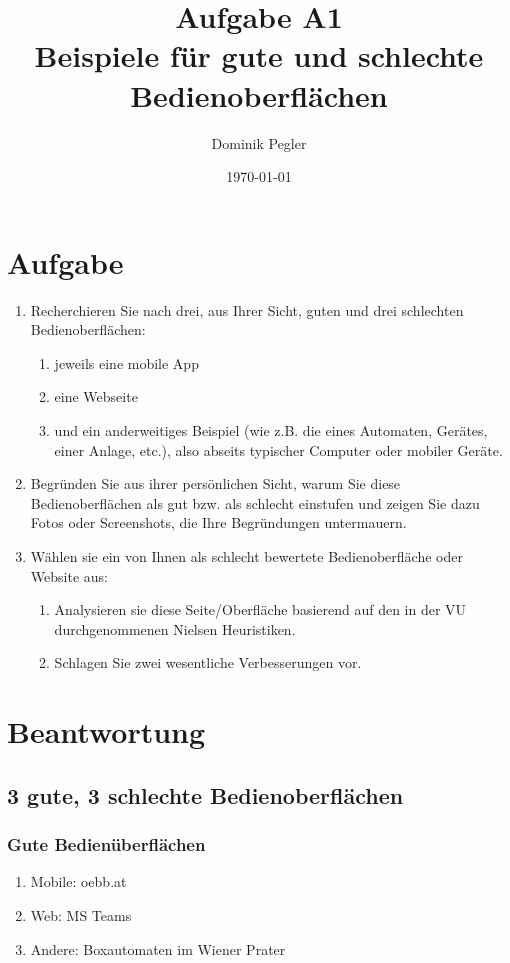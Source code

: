 \documentclass[11pt]{article}
\author{Dominik Pegler}
\date{\today}
\title{Aufgabe A1\\\medskip
\large Beispiele für gute und schlechte Bedienoberflächen}
\begin{document}
\maketitle
\tableofcontents
\section{Aufgabe}
\label{sec:orge72ece6}
\begin{enumerate}
\item Recherchieren Sie nach drei, aus Ihrer Sicht, guten und drei
schlechten Bedienoberflächen:
\begin{enumerate}
\item jeweils eine mobile App
\item eine Webseite
\item und ein anderweitiges Beispiel (wie z.B. die eines Automaten,
Gerätes, einer Anlage, etc.), also abseits typischer Computer
oder mobiler Geräte.
\end{enumerate}
\item Begründen Sie aus ihrer persönlichen Sicht, warum Sie diese
Bedienoberflächen als gut bzw. als schlecht einstufen und zeigen
Sie dazu Fotos oder Screenshots, die Ihre Begründungen
untermauern.
\item Wählen sie ein von Ihnen als schlecht bewertete Bedienoberfläche
oder Website aus:
\begin{enumerate}
\item Analysieren sie diese Seite/Oberfläche basierend auf den in der
VU durchgenommenen Nielsen Heuristiken.
\item Schlagen Sie zwei wesentliche Verbesserungen vor.
\end{enumerate}
\end{enumerate}

\section{Beantwortung}
\label{sec:org177b5f8}

\subsection{3 gute, 3 schlechte Bedienoberflächen}
\label{sec:orgf9887ee}
\subsubsection{Gute Bedienüberflächen}
\label{sec:orgc5556c5}

\begin{enumerate}
\item Mobile: oebb.at
\item Web: MS Teams
\item Andere: Boxautomaten im Wiener Prater
\end{enumerate}
\end{document}

